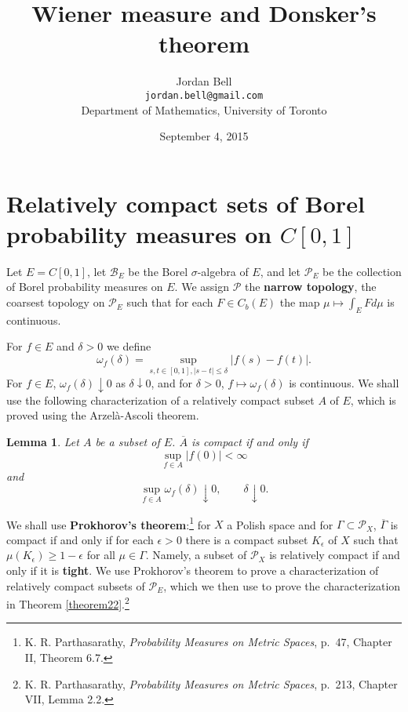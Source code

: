 \documentclass{article}
\newtheorem{lemma}[theorem]{Lemma}
\theoremstyle{definition}
\begin{document}
\title{Wiener measure and Donsker's theorem}
\author{Jordan Bell\\ \texttt{jordan.bell@gmail.com}\\Department of Mathematics, University of Toronto}
\date{September 4, 2015}

\maketitle

\section{Relatively compact sets of Borel probability measures on $C[0,1]$}
Let $E=C[0,1]$, let $\mathscr{B}_E$ be the Borel $\sigma$-algebra of $E$, and let $\mathscr{P}_E$ be the collection of Borel probability measures on $E$. We assign $\mathscr{P}$ the \textbf{narrow topology}, the coarsest topology
on $\mathscr{P}_E$ such that for each $F \in C_b(E)$ the map $\mu \mapsto \int_E F d\mu$ is continuous.



For $f \in E$ and $\delta>0$ we define
\[
\omega_f(\delta) = \sup_{s,t \in [0,1], |s-t| \leq \delta} |f(s)-f(t)|.
\]
For $f \in E$, $\omega_f(\delta) \downarrow 0$ as $\delta \downarrow 0$, and for $\delta>0$,
$f \mapsto \omega_f(\delta)$ is continuous.
We shall use the following characterization of a relatively compact subset $A$ of $E$, which is proved using the Arzel\`a-Ascoli theorem.

\begin{lemma}
Let $A$ be a  subset of $E$. $\overline{A}$ is compact if and only if
\[
\sup_{f \in A} |f(0)| < \infty
\]
and
\[
\sup_{f \in A} \omega_f(\delta) \downarrow 0,\qquad \delta \downarrow 0.
\]
\label{modulus}
\end{lemma}

We shall use \textbf{Prokhorov's theorem}:\footnote{K. R.
Parthasarathy, {\em Probability Measures on Metric Spaces}, p.~47, Chapter II, Theorem 6.7.}
for $X$ a Polish space and for $\Gamma \subset \mathscr{P}_X$, 
$\overline{\Gamma}$ is compact if and only if for each $\epsilon>0$ there is a compact
subset $K_\epsilon$ of $X$ such that $\mu(K_\epsilon) \geq 1-\epsilon$ for all $\mu \in \Gamma$. 
Namely, a subset of $\mathscr{P}_X$ is relatively compact if and only if it is \textbf{tight}.
We use Prokhorov's theorem to   prove a characterization of relatively compact subsets of $\mathscr{P}_E$, which we then use 
to prove the characterization  in Theorem \ref{theorem22}.\footnote{K. R.
Parthasarathy, {\em Probability  Measures on Metric Spaces}, p.~213, Chapter VII, Lemma 2.2.}
\end{document}
